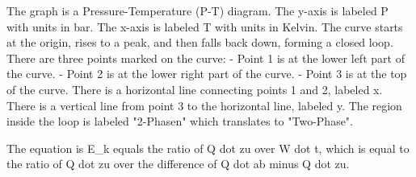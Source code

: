 The graph is a Pressure-Temperature (P-T) diagram. The y-axis is labeled P with units in bar. The x-axis is labeled T with units in Kelvin. The curve starts at the origin, rises to a peak, and then falls back down, forming a closed loop. There are three points marked on the curve:
- Point 1 is at the lower left part of the curve.
- Point 2 is at the lower right part of the curve.
- Point 3 is at the top of the curve.
There is a horizontal line connecting points 1 and 2, labeled x. There is a vertical line from point 3 to the horizontal line, labeled y. The region inside the loop is labeled "2-Phasen" which translates to "Two-Phase".

The equation is E_k equals the ratio of Q dot zu over W dot t, which is equal to the ratio of Q dot zu over the difference of Q dot ab minus Q dot zu.